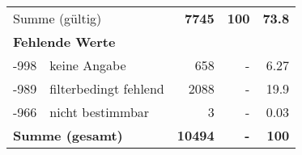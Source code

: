 \begin{longtable}{lXrrr}
     \midrule
     \multicolumn{2}{l}{Summe (gültig)} &
       \textbf{\num{7745}} &
     \textbf{100} &
       \textbf{\num[round-mode=places,round-precision=2]{73,8}} \\
     \multicolumn{5}{l}{\textbf{Fehlende Werte}}\\
       -998 &
       keine Angabe &
         \num{658} &
        - &
         \num[round-mode=places,round-precision=2]{6,27} \\
       -989 &
       filterbedingt fehlend &
         \num{2088} &
        - &
         \num[round-mode=places,round-precision=2]{19,9} \\
       -966 &
       nicht bestimmbar &
         \num{3} &
        - &
         \num[round-mode=places,round-precision=2]{0,03} \\
     \midrule
     \multicolumn{2}{l}{\textbf{Summe (gesamt)}} &
          \textbf{\num{10494}} &
        \textbf{-} &
        \textbf{100} \\
     \bottomrule
     \end{longtable}
     
